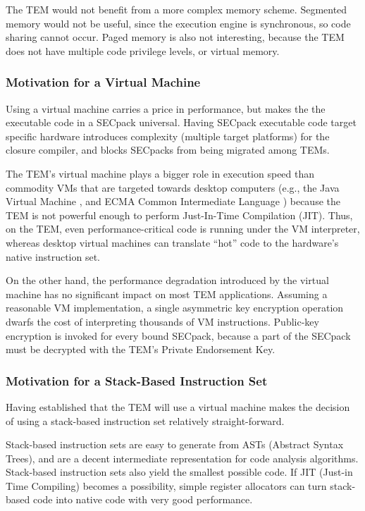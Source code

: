 The TEM would not benefit from a more complex memory scheme. Segmented memory
would not be useful, since the execution engine is synchronous, so code sharing
cannot occur. Paged memory is also not interesting, because the TEM does not
have multiple code privilege levels, or virtual memory.

\subsubsection{Motivation for a Virtual Machine}\label{arch:vm_motivation}
Using a virtual machine carries a price in performance, but makes the the executable code in a SECpack universal. Having SECpack executable code
target specific hardware introduces complexity (multiple target platforms) for
the closure compiler, and blocks SECpacks from being migrated among TEMs.

The TEM's virtual machine plays a bigger role in execution speed than commodity
VMs that are targeted towards desktop computers (e.g., the Java Virtual Machine
\cite{lindholm1999jvm}, and ECMA Common Intermediate Language
\cite{standard2001cli}) because the TEM is not powerful enough to perform
Just-In-Time Compilation (JIT). Thus, on the TEM, even performance-critical
code is running under the VM interpreter, whereas desktop virtual machines
can translate ``hot'' code to the hardware's native instruction set.

On the other hand, the performance degradation introduced by the virtual machine
has no significant impact on most TEM applications. Assuming a reasonable VM
implementation, a single asymmetric key encryption operation dwarfs the cost of
interpreting thousands of VM instructions. Public-key encryption is invoked
for every bound SECpack, because a part of the SECpack must be decrypted with
the TEM's Private Endorsement Key.

\subsubsection{Motivation for a Stack-Based Instruction
Set}\label{arch:stack_motivation}
Having established that the TEM will use a virtual machine makes the
decision of using a stack-based instruction set relatively straight-forward.

Stack-based instruction sets are easy to generate from ASTs (Abstract Syntax
Trees), and are a decent intermediate representation for code analysis
algorithms. Stack-based instruction sets also yield the smallest possible code.
If JIT (Just-in Time Compiling) becomes a possibility, simple register
allocators can turn stack-based code into native code with very good
performance. 

